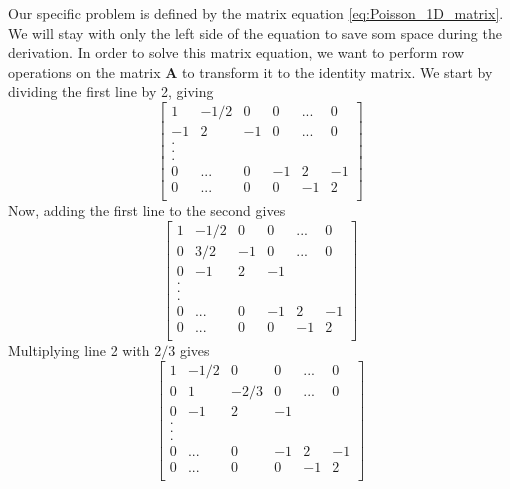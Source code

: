 \documentclass[reprint, english,notitlepage]{revtex4-1}  %
\begin{document}
Our specific problem is defined by the matrix equation \ref{eq:Poisson_1D_matrix}. We will stay with only the left side of the equation to save som space during the derivation. In order to solve this matrix equation, we want to perform row operations on the matrix $\boldsymbol A$ to transform it to the identity matrix. We start by dividing the first line by 2, giving
\begin{equation*}{}
  \begin{bmatrix}
1  & -1/2 & 0  & 0 & ... & 0 \\
-1 & 2  & -1 & 0 & ... & 0 \\
.  &    &    &   &     & \\
.  &    &    &   &     & \\
.  &    &    &   &     & \\
0  & ...& 0  &-1 & 2   & -1  \\
0  & ...& 0  & 0 &-1 & 2  \\
\end{bmatrix}
\end{equation*}
Now, adding the first line to the second gives
\begin{equation*}{}
  \begin{bmatrix}
1  & -1/2 & 0  & 0  & ... & 0 \\
0  & 3/2  & -1 & 0  & ... & 0 \\
0  & -1   &  2 & -1 &     & \\
.  &    &    &   &     & \\
.  &    &    &   &     & \\
.  &    &    &   &     & \\
0  & ...& 0  &-1 & 2   & -1  \\
0  & ...& 0  & 0 &-1 & 2  \\
\end{bmatrix}
\end{equation*}
Multiplying line 2 with $2/3$ gives
\begin{equation*}{}
  \begin{bmatrix}
1  & -1/2 & 0  & 0  & ... & 0 \\
0  & 1  & -2/3 & 0  & ... & 0 \\
0  & -1   &  2 & -1 &     & \\
.  &    &    &   &     & \\
.  &    &    &   &     & \\
.  &    &    &   &     & \\
0  & ...& 0  &-1 & 2   & -1  \\
0  & ...& 0  & 0 &-1 & 2  \\
\end{bmatrix}
\end{equation*}
\end{document}
